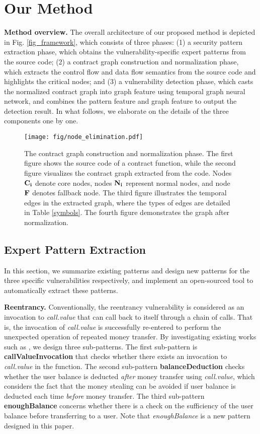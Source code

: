\section{Our Method}
\label{our_method}
\textbf{Method overview.} The overall architecture of our proposed method is depicted in Fig. \ref{fig_framework}, which consists of three phases: (1) a security pattern extraction phase, which obtains the vulnerability-specific expert patterns from the source code; (2) a contract graph construction and normalization phase, which extracts the control flow and data flow semantics from the source code and highlights the critical nodes; and (3) a vulnerability detection phase, which casts the normalized contract graph into graph feature using temporal graph neural network, and combines the pattern feature and graph feature to output the detection result. In what follows, we elaborate on the details of the three components one by one.
\begin{figure*}
	\centering
	\texttt{[image: fig/node\_elimination.pdf]} 
	\caption{The contract graph construction and normalization phase. The first figure shows the source code of a contract function, while the second figure visualizes the contract graph extracted from the code. Nodes $\bold{C_i}$ denote core nodes, nodes $\bold{N_i}$ represent normal nodes, and node $\bold{F}$ denotes fallback node. The third figure illustrates the temporal edges in the extracted graph, where the types of edges are detailed in Table \ref{symbols}. The fourth figure demonstrates the graph after normalization.}
	\label{fig:normalization}
	 \vspace{-1.6em}
\end{figure*}

\vspace{-0.7em}
\subsection{Expert Pattern Extraction}
\label{pattern_representation}
In this section, we summarize existing patterns and design new patterns for the three specific vulnerabilities respectively, and implement an open-sourced tool to automatically extract these patterns.

\textbf{Reentrancy.} Conventionally, the reentrancy vulnerability is considered as an invocation to \emph{call.value} that can call back to itself through a chain of calls. That is, the invocation of \emph{call.value} is successfully re-entered to perform the unexpected operation of repeated money transfer. By investigating existing works such as \cite{oyente,contractfuzzer,zeus}, we design three sub-patterns. The first sub-pattern is \textbf{callValueInvocation} that checks whether there exists an invocation to \emph{call.value} in the function. The second sub-pattern \textbf{balanceDeduction} checks whether the user balance is deducted \emph{after} money transfer using \emph{call.value}, which considers the fact that the money stealing can be avoided if user balance is deducted each time \emph{before} money transfer. The third sub-pattern \textbf{enoughBalance} concerns whether there is a check on the sufficiency of the user balance before transferring to a user. Note that \emph{enoughBalance} is a new pattern designed in this paper.

